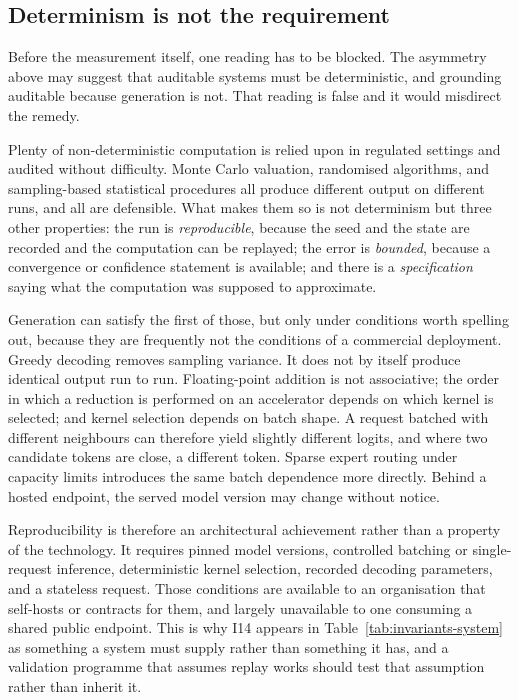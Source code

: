 \documentclass[11pt]{article}
\theoremstyle{plain}
\theoremstyle{definition}
\begin{document}
\subsection{Determinism is not the requirement}
\label{sec:determinism}

Before the measurement itself, one reading has to be blocked. The asymmetry above may
suggest that auditable systems must be deterministic, and grounding auditable because
generation is not. That reading is false and it would misdirect the remedy.

Plenty of non-deterministic computation is relied upon in regulated settings and
audited without difficulty. Monte Carlo valuation, randomised algorithms, and
sampling-based statistical procedures all produce different output on different
runs, and all are defensible. What makes them so is not determinism but three other
properties: the run is \emph{reproducible}, because the seed and the state are
recorded and the computation can be replayed; the error is \emph{bounded}, because a
convergence or confidence statement is available; and there is a
\emph{specification} saying what the computation was supposed to approximate.

Generation can satisfy the first of those, but only under conditions worth
spelling out, because they are frequently not the conditions of a commercial
deployment. Greedy decoding removes sampling variance. It does not by itself produce
identical output run to run. Floating-point addition is not associative; the order in
which a reduction is performed on an accelerator depends on which kernel is selected;
and kernel selection depends on batch shape. A request batched with different
neighbours can therefore yield slightly different logits, and where two candidate
tokens are close, a different token. Sparse expert routing under capacity limits
introduces the same batch dependence more directly. Behind a hosted endpoint, the
served model version may change without notice.

Reproducibility is therefore an architectural achievement rather than a property of
the technology. It requires pinned model versions, controlled batching or
single-request inference, deterministic kernel selection, recorded decoding
parameters, and a stateless request. Those conditions are available to an
organisation that self-hosts or contracts for them, and largely unavailable to one
consuming a shared public endpoint. This is why I14 appears in
Table~\ref{tab:invariants-system} as something a system must supply rather than
something it has, and a validation programme that assumes replay works should test
that assumption rather than inherit it.
\end{document}
